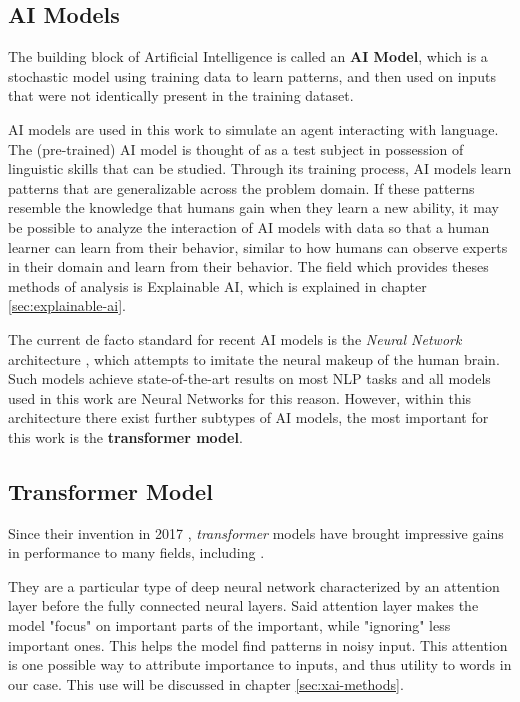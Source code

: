 \subsection{AI Models}
The building block of Artificial Intelligence is called an \textbf{AI Model}, which is a stochastic model using training data to learn patterns, and then used on inputs that were not identically present in the training dataset.

AI models are used in this work to simulate an agent interacting with language.
The (pre-trained) AI model is thought of as a test subject in possession of linguistic skills that can be studied.
Through its training process, AI models learn patterns that are generalizable across the problem domain.
If these patterns resemble the knowledge that humans gain when they learn a new ability, it may be possible to analyze the interaction of AI models with data so that a human learner can learn from their behavior, similar to how humans can observe experts in their domain and learn from their behavior.
The field which provides theses methods of analysis is Explainable AI, which is explained in chapter \ref{sec:explainable-ai}.

The current de facto standard for recent AI models is the \textit{Neural Network} architecture \cite{jurafskySpeechLanguageProcessing2025}, which attempts to imitate the neural makeup of the human brain.
Such models achieve state-of-the-art results on most NLP tasks  and all models used in this work are Neural Networks for this reason.
However, within this architecture there exist further subtypes of AI models, the most important for this work is the \textbf{transformer model}.


\subsection{Transformer Model} \label{sec:transformer}
Since their invention in 2017 \cite{vaswani2017attention}, \textit{transformer} models have brought impressive gains in performance to many fields, including \NLP.

They are a particular type of deep neural network characterized by an attention layer before the fully connected neural layers.
Said attention layer makes the model "focus" on important parts of the important, while "ignoring" less important ones.
This helps the model find patterns in noisy input.
This attention is one possible way to attribute importance to inputs, and thus utility to words in our case.
This use will be discussed in chapter \ref{sec:xai-methods}.

